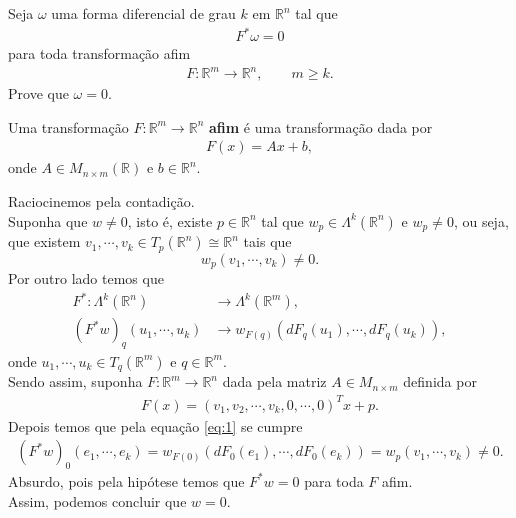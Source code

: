 \begin{homeworkProblem}[Seção 1-1]
  Seja $\omega$ uma forma diferencial de grau $k$ em $\mathbb{R}^n$ tal que
  \begin{align*}
    F^{*}\omega = 0
  \end{align*}
  para toda transformação afim
  \begin{align*}
    F:\mathbb{R}^{m}\longrightarrow\mathbb{R}^{n},\qquad m\geq k. 
  \end{align*}
  Prove que $\omega=0$.
  \begin{definition}{}
    Uma transformação $F:\mathbb{R}^{m}\to\mathbb{R}^{n}$ \textbf{afim} é uma transformação dada por
    \begin{align*}
      F(x)=Ax+b,
    \end{align*}
    onde $A\in M_{n\times m}(\mathbb{R})$ e $b\in\mathbb{R}^{n}$. 
  \end{definition}
  \begin{solution}
    Raciocinemos pela contadição.\\
    Suponha que $w\neq 0$, isto é, existe $p\in\mathbb{R}^{n}$ tal que $w_p\in\Lambda^{k}(\mathbb{R}^{n})$ e $w_p\neq 0$, ou seja, que existem $v_1,\cdots,v_k\in T_{p}(\mathbb{R}^{n})\cong \mathbb{R}^{n}$ tais que
    \begin{equation}\label{eq:1}
      w_p(v_1,\cdots,v_k)\neq 0.
    \end{equation}
    Por outro lado temos que
    \begin{align*}
      F^{\ast}:\Lambda^{k}(\mathbb{R}^{n})&\to\Lambda^{k}(\mathbb{R}^{m}),\\
    (F^{\ast}w)_{q}(u_1,\cdots,u_k)&\to w_{F(q)}\left( dF_{q}(u_1),\cdots,dF_{q}(u_k) \right),
    \end{align*}
    onde $u_1,\cdots,u_k\in T_{q}(\mathbb{R}^{m})$ e $q\in \mathbb{R}^{m}$.\\
    Sendo assim, suponha $F:\mathbb{R}^{m}\to\mathbb{R}^{n}$ dada pela matriz $A\in M_{n\times m}$ definida por 
    \begin{align*}
      F(x)=\left(v_{1}, v_{2}, \cdots, v_k, 0, \cdots, 0\right)^{T}x+p.
    \end{align*}
    Depois temos que pela equação \ref{eq:1} se cumpre
    \begin{align*}
      (F^{\ast}w)_{0}(e_1,\cdots,e_k)=w_{F(0)}(dF_{0}(e_1),\cdots,dF_{0}(e_k))=w_{p}(v_1,\cdots,v_k)\neq 0.
    \end{align*}
    Absurdo, pois pela hipótese temos que $F^{\ast}w=0$ para toda $F$ afim.\\
    Assim, podemos concluir que $w=0$.
  \end{solution}
\end{homeworkProblem}
